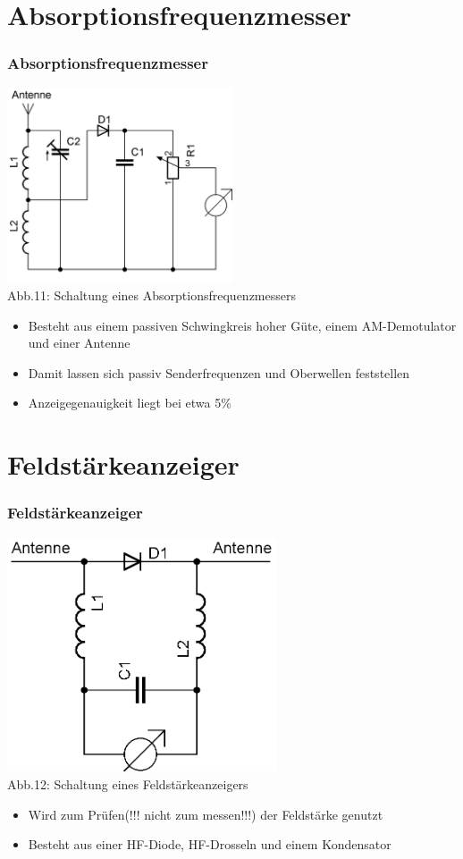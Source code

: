 \section*{Absorptionsfrequenzmesser}
\begin{frame}
    \frametitle{Absorptionsfrequenzmesser}
    \begin{center}
        \includegraphics[width=0.5\textwidth]{a16/Absorptionsfrequenzmesser.png}\\
        Abb.11: Schaltung eines Absorptionsfrequenzmessers
	\end{center}
	\begin{itemize}
		\item	Besteht aus einem passiven Schwingkreis hoher Güte, einem AM-Demotulator und einer Antenne
		\item	Damit lassen sich passiv Senderfrequenzen und Oberwellen feststellen
		\item	Anzeigegenauigkeit liegt bei etwa 5\%
	\end{itemize}
\end{frame}

\section*{Feldstärkeanzeiger}
\begin{frame}
    \frametitle{Feldstärkeanzeiger}
    \begin{center}
        \includegraphics[width=0.6\textwidth]{a16/Feldstaerkeanzeiger.png}\\
        Abb.12: Schaltung eines Feldstärkeanzeigers
	\end{center}
	\begin{itemize}
		\item	Wird zum Prüfen(!!! nicht zum messen!!!) der Feldstärke genutzt
		\item	Besteht aus einer HF-Diode, HF-Drosseln und einem Kondensator
	\end{itemize}
\end{frame}

